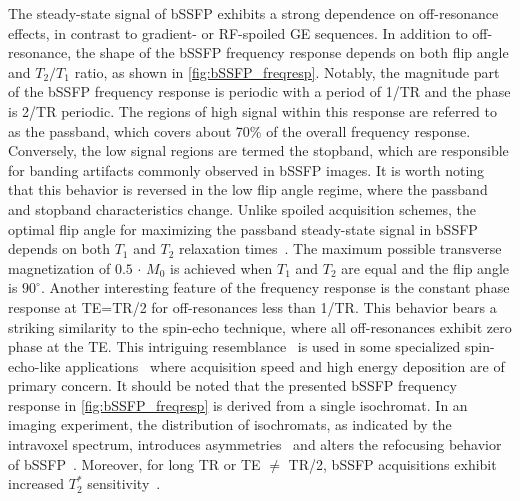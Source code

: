The steady-state signal of \gls{bSSFP} exhibits a strong dependence on off-resonance effects, in contrast to gradient- or RF-spoiled \gls{GE} sequences. In addition to off-resonance, the shape of the bSSFP frequency response depends on both flip angle and $T_2/T_1$ ratio, as shown in \cref{fig:bSSFP_freqresp}. Notably, the magnitude part of the bSSFP frequency response is periodic with a period of 1/\gls{TR} and the phase is 2/\gls{TR} periodic. The regions of high signal within this response are referred to as the passband, which covers about 70\% of the overall frequency response. Conversely, the low signal regions are termed the stopband, which are responsible for banding artifacts commonly observed in bSSFP images. It is worth noting that this behavior is reversed in the low flip angle regime, where the passband and stopband characteristics change. Unlike spoiled acquisition schemes, the optimal flip angle for maximizing the passband steady-state signal in bSSFP depends on both $T_1$ and $T_2$ relaxation times~\cite{bieriFundamentalsBalancedSteady2013}. The maximum possible transverse magnetization of $0.5\,\cdot\,M_0$ is achieved when $T_1$ and $T_2$ are equal and the flip angle is $90^\circ$. Another interesting feature of the frequency response is the constant phase response at \gls{TE}=\gls{TR}/2 for off-resonances less than 1/\gls{TR}. This behavior bears a striking similarity to the spin-echo technique, where all off-resonances exhibit zero phase at the \gls{TE}. This intriguing resemblance~\cite{schefflerTrueFISPGradientechoSpinecho2003} is used in some specialized spin-echo-like applications~\cite{bowenHighFieldBalancedSSFP2005,schefflerHighresolutionFunctionalImaging2015} where acquisition speed and high energy deposition are of primary concern. It should be noted that the presented \gls{bSSFP} frequency response in \cref{fig:bSSFP_freqresp} is derived from a single isochromat. In an imaging experiment, the distribution of isochromats, as indicated by the intravoxel spectrum, introduces asymmetries~\cite{millerAsymmetriesBalancedSSFP2010} and alters the refocusing behavior of bSSFP~\cite{ganterStaticSusceptibilityEffects2006}. Moreover, for long \gls{TR} or \gls{TE} $\neq$ \gls{TR}/2, \gls{bSSFP} acquisitions exhibit increased $T_2^*$ sensitivity~\cite{leupoldSteadystateFreePrecession2017}.

